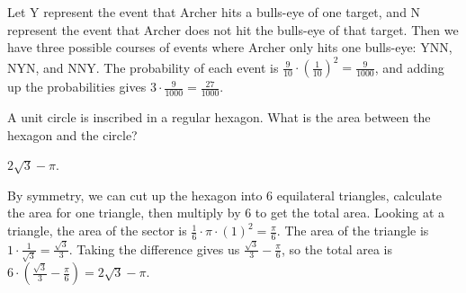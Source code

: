 \documentclass[11pt]{article}
\begin{document}
\begin{solution}
Let Y represent the event that Archer hits a bulls-eye of one target, and N represent the event that Archer does not hit the bulls-eye of that target. Then we have three possible courses of events where Archer only hits one bulls-eye: YNN, NYN, and NNY. The probability of each event is $\frac{9}{10}\cdot(\frac{1}{10})^2 = \frac{9}{1000}$, and adding up the probabilities gives $3\cdot\frac{9}{1000} = \boxed{\frac{27}{1000}}$.
\end{solution}

\begin{problem}
A unit circle is inscribed in a regular hexagon. What is the area between the hexagon and the circle?
\end{problem}

\begin{answer}
$\boxed{2\sqrt{3} - \pi}.$
\end{answer}

\begin{solution}
By symmetry, we can cut up the hexagon into 6 equilateral triangles, calculate the area for one triangle, then multiply by 6 to get the total area. Looking at a triangle, the area of the sector is $\frac{1}{6}\cdot\pi\cdot(1)^2 = \frac{\pi}{6}$. The area of the triangle is $1\cdot\frac{1}{\sqrt{3}} = \frac{\sqrt{3}}{3}$. Taking the difference gives us $\frac{\sqrt{3}}{3} - \frac{\pi}{6}$, so the total area is $6\cdot(\frac{\sqrt{3}}{3} - \frac{\pi}{6}) = \boxed{2\sqrt{3} - \pi}$.
\end{solution}
\end{document}
